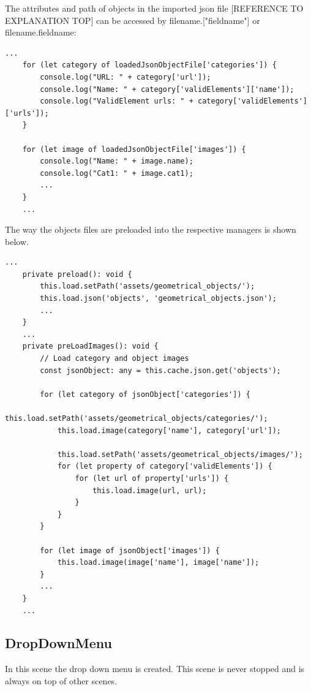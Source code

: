 The attributes and path of objects in the imported json file [REFERENCE TO EXPLANATION TOP]
can be accessed by filename.["fieldname"] or filename.fieldname:

\begin{lstlisting}[style=TypeScript, caption={Example json file access}]
    ...
    for (let category of loadedJsonObjectFile['categories']) {
        console.log("URL: " + category['url']);
        console.log("Name: " + category['validElements']['name']);
        console.log("ValidElement urls: " + category['validElements']['urls']);
    }

    for (let image of loadedJsonObjectFile['images']) {
        console.log("Name: " + image.name);
        console.log("Cat1: " + image.cat1);
        ...
    }
    ...
\end{lstlisting}

The way the objects files are preloaded into the respective managers is shown below.

\begin{lstlisting}[style=TypeScript, caption={preloadAsset.ts}]
    ...
    private preload(): void {
        this.load.setPath('assets/geometrical_objects/');
        this.load.json('objects', 'geometrical_objects.json');
        ...
    }
    ...
    private preLoadImages(): void {
        // Load category and object images
        const jsonObject: any = this.cache.json.get('objects');

        for (let category of jsonObject['categories']) {
            this.load.setPath('assets/geometrical_objects/categories/');
            this.load.image(category['name'], category['url']);

            this.load.setPath('assets/geometrical_objects/images/');
            for (let property of category['validElements']) {
                for (let url of property['urls']) {
                    this.load.image(url, url);
                }
            }
        }

        for (let image of jsonObject['images']) {
            this.load.image(image['name'], image['name']);
        }
        ...
    }
    ...
\end{lstlisting}

\subsection{DropDownMenu}\label{subsec:dropdownmenu}
In this scene the drop down menu is created.
This scene is never stopped and is always on top of other scenes.

